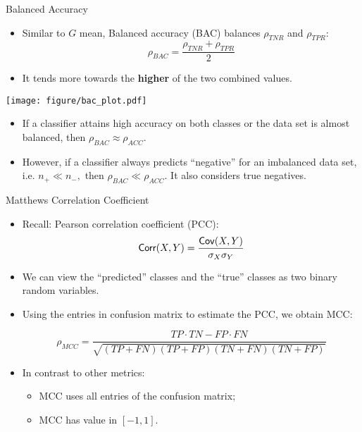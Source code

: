 \documentclass[11pt,compress,t,notes=noshow, xcolor=table]{beamer}
\begin{document}
\begin{vbframe}{Balanced Accuracy}
	\footnotesize
	
	\begin{minipage}[c]{0.5\textwidth}
		\footnotesize
		\begin{itemize}
			\item Similar to $G$ mean, Balanced accuracy (BAC) balances $\rho_{TNR}$ and $\rho_{TPR}$: 
			$$\rho_{BAC} = \frac{\rho_{TNR} + \rho_{TPR}}{2}$$
			\item  It tends more towards the \textbf{higher} of the two combined values.
		\end{itemize}
	\end{minipage}%
	\begin{minipage}[c]{0.5\textwidth}
		\centering
		\texttt{[image: figure/bac\_plot.pdf]}
	\end{minipage}
	\begin{itemize}
		\item If a classifier attains high accuracy on both classes or the data set is almost balanced, then $\rho_{BAC} \approx \rho_{ACC}$.
        \vspace{20pt}
        
		\item However, if a classifier always predicts ``negative'' for an imbalanced data set, i.e. $n_+  \ll n_-,$ then $\rho_{BAC} \ll \rho_{ACC}$. It also considers true negatives.

	\end{itemize}
	
\end{vbframe}


\begin{vbframe}{Matthews Correlation Coefficient}
	\footnotesize{
	\begin{itemize}
        \item Recall: Pearson correlation coefficient (PCC): 
            $$\mathsf{Corr}(X, Y) = \frac{\mathsf{Cov}(X, Y)}{\sigma_{X} \sigma_{Y}}$$
		\item We can view the ``predicted'' classes and the ``true'' classes as two binary random variables.
        \vspace{20pt}
  
        \item Using the entries in confusion matrix to estimate the PCC, we obtain MCC:
	
		$$   \rho_{MCC} = \frac{TP\cdot TN - FP \cdot FN}{\sqrt{(TP+FN)(TP+FP)(TN+FN)(TN+FP)}}$$
        \vspace{20pt}

        \item In contrast to other metrics: 
        \begin{itemize}
            \footnotesize
            \item MCC uses all entries of the confusion matrix;
            \item MCC has value in $[-1,1]$.
        \end{itemize}
		
    \end{itemize}
	
	}
\end{vbframe}
\end{document}
